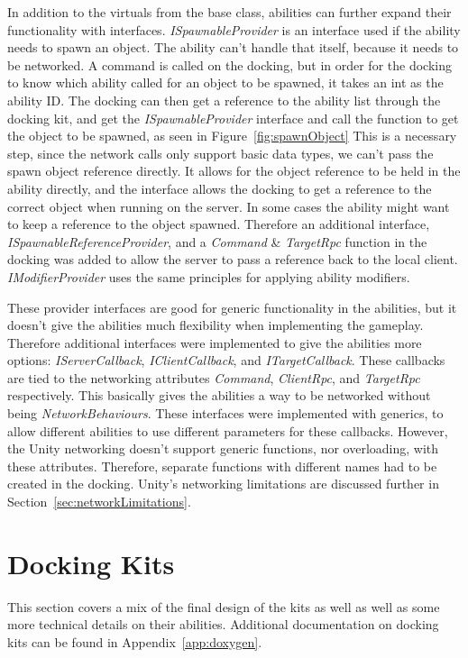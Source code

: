 In addition to the virtuals from the base class, abilities can further expand their functionality with interfaces. \emph{ISpawnableProvider} is an interface used if the ability needs to spawn an object. The ability can't handle that itself, because it needs to be networked. A command is called on the docking, but in order for the docking to know which ability called for an object to be spawned, it takes an int as the ability ID. The docking can then get a reference to the ability list through the docking kit, and get the \emph{ISpawnableProvider} interface and call the function to get the object to be spawned, as seen in Figure~\ref{fig:spawnObject} This is a necessary step, since the network calls only support basic data types, we can't pass the spawn object reference directly. It allows for the object reference to be held in the ability directly, and the interface allows the docking to get a reference to the correct object when running on the server. In some cases the ability might want to keep a reference to the object spawned. Therefore an additional interface, \emph{ISpawnableReferenceProvider}, and a \emph{Command} \& \emph{TargetRpc} function in the docking was added to allow the server to pass a reference back to the local client. \emph{IModifierProvider} uses the same principles for applying ability modifiers.

These provider interfaces are good for generic functionality in the abilities, but it doesn't give the abilities much flexibility when implementing the gameplay. Therefore additional interfaces were implemented to give the abilities more options: \emph{IServerCallback}, \emph{IClientCallback}, and \emph{ITargetCallback}. These callbacks are tied to the networking attributes \emph{Command}, \emph{ClientRpc}, and \emph{TargetRpc} respectively. This basically gives the abilities a way to be networked without being \emph{NetworkBehaviours}. These interfaces were implemented with generics, to allow different abilities to use different parameters for these callbacks. However, the Unity networking doesn't support generic functions, nor overloading, with these attributes. Therefore, separate functions with different names had to be created in the docking. Unity's networking limitations are discussed further in Section~\ref{sec:networkLimitations}.

\section{Docking Kits}
\label{sec:dockingKits}
This section covers a mix of the final design of the kits as well as well as some more technical details on their abilities. Additional documentation on docking kits can be found in Appendix~\ref{app:doxygen}.

